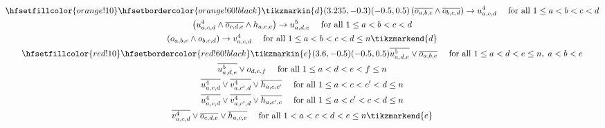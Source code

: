 \begin{figure}
\begin{framed}
\begin{spreadlines}{16pt}
\begin{gather}
\hfsetfillcolor{orange!10}
\hfsetbordercolor{orange!60!black}
\tikzmarkin{d}(3.235,-0.3)(-0.5,0.5)
  \left(\ov{\orvar_{a,b,c}} \land \ov{\orvar_{b,c,d}}\right) \rightarrow \uvar_{a, c, d} \quad \text{ for all } 1 \leq a < b < c < d\\ 
  \left(\uvar_{a,c,d} \land \ov{\orvar_{c,d,e}} \land \hvar_{a,c,e}\right)\rightarrow \ufvar_{a, d, e}  \quad \text{ for all } 1 \leq a < b < c < d\\ 
  \left(\orvar_{a, b, c} \land \orvar_{b, c, d}\right) \rightarrow \vvar_{a, c, d} \quad \text{ for all } 1 \leq a < b < c < d \leq n \tikzmarkend{d}\\
\hfsetfillcolor{red!10}
\hfsetbordercolor{red!60!black}
\tikzmarkin{e}(3.6,-0.5)(-0.5,0.5)
  \ov{\ufvar_{a,d,e}} \lor \ov{\orvar_{a, b, e}} \quad \text { for all } 1 \leq a < d < e \leq n, \; a < b < e\\
  \ov{\ufvar_{a,d,e}} \lor \orvar_{d, e, f} \quad \text { for all } 1 \leq a < d < e < f\leq n\\
  \ov{\uvar_{a,c,d}} \lor \ov{\vvar_{a, c', d}} \lor \ov{\hvar_{a,c,c'}} \quad \text{ for all } 1 \leq a < c < c' < d \leq n\\
  \ov{\uvar_{a,c,d}} \lor \ov{\vvar_{a, c', d}} \lor \ov{\hvar_{a,c',c}} \quad \text{ for all } 1 \leq a < c' < c < d \leq n\\
  \ov{\vvar_{a,c,d}} \lor \ov{\orvar_{c, d, e}} \lor \ov{\hvar_{a,c,e}} \quad \text{ for all } 1 < a < c < d < e \leq n
\tikzmarkend{e}
  \end{gather}
\end{spreadlines}
\end{framed}
\end{figure}